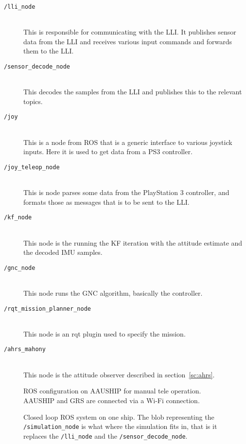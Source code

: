 \begin{description}
	\item[\texttt{/lli\_node}]\hfill \\
		This is responsible for communicating with the \ac{LLI}. It
		publishes sensor data from the \ac{LLI} and receives various input
		commands and forwards them to the \ac{LLI}.
	\item[\texttt{/sensor\_decode\_node}]\hfill \\
		This decodes the samples from the \ac{LLI} and publishes this to
		the relevant topics. 
	\item[\texttt{/joy}]\hfill \\
		This is a node from \ac{ROS} that is a generic interface to
		various joystick inputs. Here it is used to get data from a PS3
		controller.
	\item[\texttt{/joy\_teleop\_node}]\hfill \\
		This is node parses some data from the PlayStation 3 controller, and formats
		those as messages that is to be sent to the \ac{LLI}.
	\item[\texttt{/kf\_node}]\hfill \\
		This node is the running the \ac{KF} iteration with the attitude estimate and
		the decoded \ac{IMU} samples.
	\item[\texttt{/gnc\_node}]\hfill \\
		This node runs the \ac{GNC} algorithm, basically the controller.
	\item[\texttt{/rqt\_mission\_planner\_node}]\hfill \\
		This node is an rqt plugin used to specify the mission.
	\item[\texttt{/ahrs\_mahony}]\hfill \\
		This node is the attitude observer described in
		section~\vref{sc:ahrs}.
\end{description}

\begin{figure}[htbp]
	\centering
	
	\caption{ROS configuration on AAUSHIP for manual tele operation.
	AAUSHIP and GRS are connected via a Wi-Fi connection.}
	\label{fig:ros-aauship-teleop}
\end{figure}

\begin{figure}[htbp]
	\centering
	{\footnotesize
	}
	\caption{Closed loop ROS system on one ship. The blob representing
		the \texttt{/simulation\_node} is what where the simulation fits
		in, that is it replaces the \texttt{/lli\_node} and the
		\texttt{/sensor\_decode\_node}.}
	\label{fig:ros-aauship-closed-loop-single}
\end{figure}

